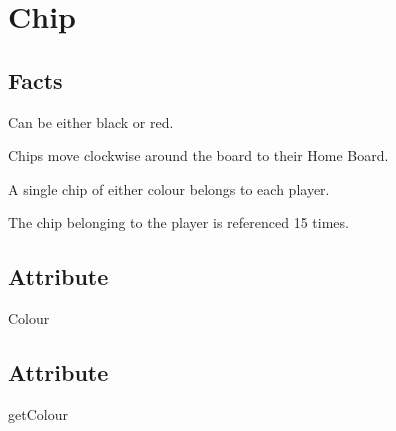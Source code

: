 \section{Chip}

\subsection{Facts}
\begin{dashed}
    \item Can be either black or red.
    \item Chips move clockwise around the board to their Home Board.
    \item A single chip of either colour belongs to each player.
    \item The chip belonging to the player is referenced 15 times.
\end{dashed}

\subsection{Attribute}
\begin{dashed}
    \item Colour
\end{dashed}

\subsection{Attribute}
\begin{dashed}
    \item getColour
\end{dashed}

